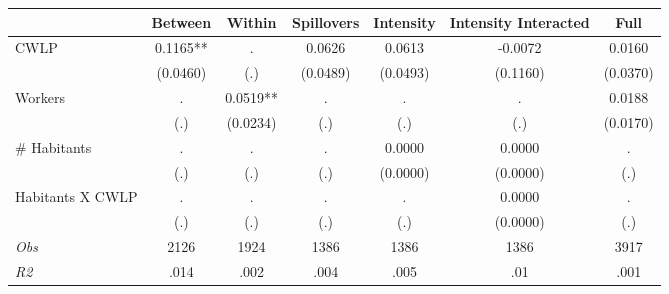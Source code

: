 \begin{tabular}{l*{6}{c}}\hline&\multicolumn{1}{c}{Between}&\multicolumn{1}{c}{Within}&\multicolumn{1}{c}{Spillovers}&\multicolumn{1}{c}{Intensity}&\multicolumn{1}{c}{Intensity Interacted}&\multicolumn{1}{c}{Full}\\ \hline 
CWLP & 0.1165** & . & 0.0626 & 0.0613 & -0.0072 & 0.0160 \\
 & (0.0460) & (.) & (0.0489) & (0.0493) & (0.1160) & (0.0370) \\
Workers & . & 0.0519** & . & . & . & 0.0188 \\
 & (.) & (0.0234) & (.) & (.) & (.) & (0.0170) \\
\# Habitants & . & . & . & 0.0000 & 0.0000 & . \\
 & (.) & (.) & (.) & (0.0000) & (0.0000) & (.) \\
Habitants X CWLP & . & . & . & . & 0.0000 & . \\
 & (.) & (.) & (.) & (.) & (0.0000) & (.) \\
\hline \textit{Obs} & 2126 & 1924 & 1386 & 1386 & 1386 & 3917 \\ \textit{R2} & .014 & .002 & .004 & .005 & .01 & .001 \\ \hline \end{tabular}
